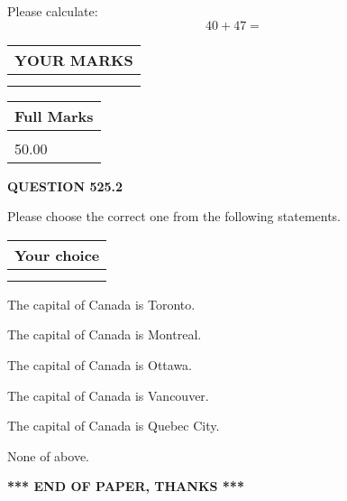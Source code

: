 \documentclass[12pt]{article}
\begin{document}
  
 
Please calculate:
\begin{equation}
40 +  %
47 = \nonumber
\end{equation}
 

 

 
  
\vspace{0.2in}
  
\noindent\begin{tabular}{|l|}
\hline
 YOUR MARKS  \\
\hline
 \\ 
 \\ 
\hline
\end{tabular}
\hspace{0.05in} \begin{tabular}{|l|}
\hline
 Full Marks  \\
\hline
 \\ 
50.00 \\
\hline
\end{tabular}
{\textbf{\Large{QUESTION
525.2 
}}}
  
  
Please choose the correct one from the following statements.
  
  
\noindent\hspace{3.0in} \begin{tabular}{|l|}
\hline
Your choice \\
\hline
 \\ 
 \\ 
\hline
\end{tabular}
  
  
 
 
The capital of Canada is Toronto.
 
 
The capital of Canada is Montreal.
 
 
The capital of Canada is Ottawa.
 
 
The capital of Canada is Vancouver.
 
 
The capital of Canada is Quebec City.
 
 
 None of above.
 
 
   
   
 \vspace{0.2in}
 
   
   
   
   
\vspace{1.0in} 
{\textbf{\large{ *** END OF PAPER, THANKS *** }}} 
   
\end{document}
